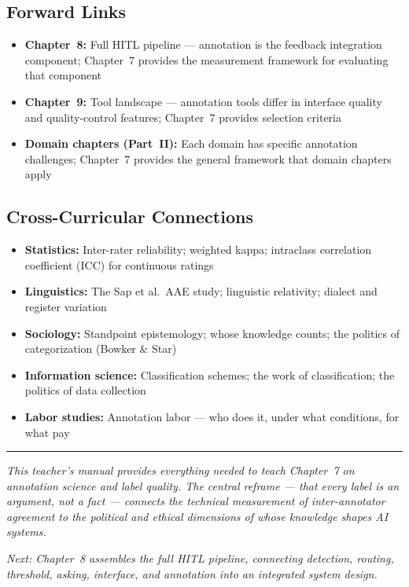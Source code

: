\subsection{Forward Links}
\begin{itemize}
    \item \textbf{Chapter~8:} Full HITL pipeline --- annotation is the feedback integration component; Chapter~7 provides the measurement framework for evaluating that component
    \item \textbf{Chapter~9:} Tool landscape --- annotation tools differ in interface quality and quality-control features; Chapter~7 provides selection criteria
    \item \textbf{Domain chapters (Part~II):} Each domain has specific annotation challenges; Chapter~7 provides the general framework that domain chapters apply
\end{itemize}

\subsection{Cross-Curricular Connections}
\begin{itemize}
    \item \textbf{Statistics:} Inter-rater reliability; weighted kappa; intraclass correlation coefficient (ICC) for continuous ratings
    \item \textbf{Linguistics:} The Sap et al.\ AAE study; linguistic relativity; dialect and register variation
    \item \textbf{Sociology:} Standpoint epistemology; whose knowledge counts; the politics of categorization (Bowker \& Star)
    \item \textbf{Information science:} Classification schemes; the work of classification; the politics of data collection
    \item \textbf{Labor studies:} Annotation labor --- who does it, under what conditions, for what pay
\end{itemize}

\bigskip
\begin{center}
\rule{0.5\textwidth}{0.4pt}
\end{center}
\bigskip

\noindent\textit{This teacher's manual provides everything needed to teach Chapter~7 on annotation science and label quality. The central reframe --- that every label is an argument, not a fact --- connects the technical measurement of inter-annotator agreement to the political and ethical dimensions of whose knowledge shapes AI systems.}

\medskip
\noindent\textit{Next: Chapter~8 assembles the full HITL pipeline, connecting detection, routing, threshold, asking, interface, and annotation into an integrated system design.}
